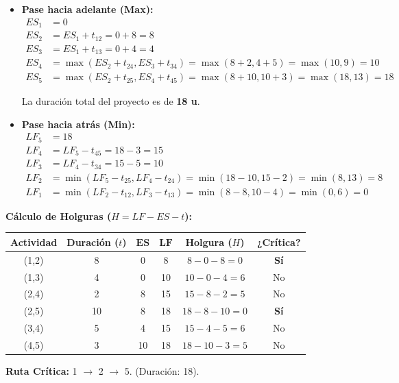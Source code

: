 \documentclass[10pt,a4paper]{article}
\begin{document}
\begin{itemize}
    \item \textbf{Pase hacia adelante (Max):}
    \begin{align*}
        ES_1 &= 0 \\
        ES_2 &= ES_1 + t_{12} = 0 + 8 = 8 \\
        ES_3 &= ES_1 + t_{13} = 0 + 4 = 4 \\
        ES_4 &= \max(ES_2 + t_{24}, ES_3 + t_{34}) = \max(8+2, 4+5) = \max(10, 9) = 10 \\
        ES_5 &= \max(ES_2 + t_{25}, ES_4 + t_{45}) = \max(8+10, 10+3) = \max(18, 13) = 18
    \end{align*}
    
    La duración total del proyecto es de \textbf{18 u}.
    
    \item \textbf{Pase hacia atrás (Min):}
    \begin{align*}
        LF_5 &= 18 \\
        LF_4 &= LF_5 - t_{45} = 18 - 3 = 15 \\
        LF_3 &= LF_4 - t_{34} = 15 - 5 = 10 \\
        LF_2 &= \min(LF_5 - t_{25}, LF_4 - t_{24}) = \min(18-10, 15-2) = \min(8, 13) = 8 \\
        LF_1 &= \min(LF_2 - t_{12}, LF_3 - t_{13}) = \min(8-8, 10-4) = \min(0, 6) = 0
    \end{align*}
\end{itemize}

\textbf{Cálculo de Holguras ($H = LF - ES - t$):}
\begin{table}[H]
\centering
\begin{tabular}{cccccc}
\toprule
\textbf{Actividad} & \textbf{Duración ($t$)} & $\mathbf{ES}$ & $\mathbf{LF}$ & \textbf{Holgura ($H$)} & \textbf{¿Crítica?} \\
\midrule
(1,2) & 8 & 0 & 8 & $8 - 0 - 8 = 0$ & \textbf{Sí} \\
(1,3) & 4 & 0 & 10 & $10 - 0 - 4 = 6$ & No \\
(2,4) & 2 & 8 & 15 & $15 - 8 - 2 = 5$ & No \\
(2,5) & 10 & 8 & 18 & $18 - 8 - 10 = 0$ & \textbf{Sí} \\
(3,4) & 5 & 4 & 15 & $15 - 4 - 5 = 6$ & No \\
(4,5) & 3 & 10 & 18 & $18 - 10 - 3 = 5$ & No \\
\bottomrule
\end{tabular}
\end{table}
\textbf{Ruta Crítica:} 1 $\rightarrow$ 2 $\rightarrow$ 5. (Duración: 18).
\end{document}
